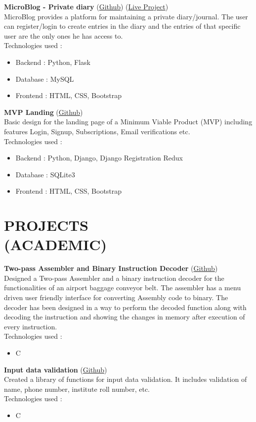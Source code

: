 \documentclass[margin]{res}
\begin{document}
\begin{resume}
   {\textbf{MicroBlog - Private diary}} (\href{https://github.com/gauravkulkarni96/MicroBlog}{Github}) (\href{https://microblog96.herokuapp.com}{Live Project})\\
    MicroBlog provides a platform for maintaining a private diary/journal. The user can register/login to create entries in the diary and the entries of that specific user are the only ones he has access to.\\
Technologies used :
    \begin{itemize} \itemsep -2pt
     \item Backend : Python, Flask
     \item Database : MySQL
     \item Frontend : HTML, CSS, Bootstrap
     \end{itemize}

   {\textbf{MVP Landing}} (\href{https://github.com/gauravkulkarni96/sample-django-project}{Github})\\
    Basic design for the landing page of a Minimum Viable Product (MVP) including features Login, Signup, Subscriptions, Email verifications etc.\\
Technologies used :
    \begin{itemize} \itemsep -2pt
     \item Backend : Python, Django, Django Registration Redux
     \item Database : SQLite3
     \item Frontend : HTML, CSS, Bootstrap
     \end{itemize}

\section{PROJECTS\\(ACADEMIC)}
{\textbf{Two-pass Assembler and Binary Instruction Decoder}} (\href{https://github.com/gauravkulkarni96/Assembler-decoder}{Github})\\
    Designed a Two-pass Assembler and a binary instruction decoder for the functionalities of an airport baggage conveyor belt. The assembler has a menu driven user friendly interface for converting Assembly code to binary. The decoder has been designed in a way to perform the decoded function along with decoding the instruction and showing the changes in memory after execution of every instruction.\\
Technologies used :
    \begin{itemize} \itemsep -2pt
     \item C
     \end{itemize}
\newpage
{\textbf{Input data validation}} (\href{https://github.com/gauravkulkarni96/data-validation}{Github})\\
    Created a library of functions for input data validation. It includes validation of name, phone number, institute roll number, etc.\\
Technologies used :
    \begin{itemize} \itemsep -2pt
     \item C
     \end{itemize}


\end{resume}
\end{document}

